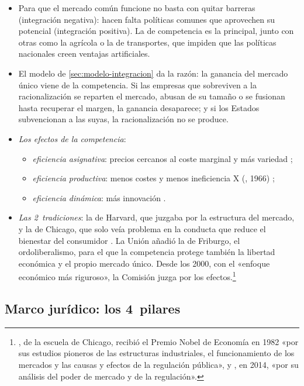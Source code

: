\documentclass[11pt]{article}
\begin{document}
\begin{itemize}
\item Para que el mercado común funcione no basta con quitar barreras (integración negativa): hacen falta políticas comunes que aprovechen su potencial (integración positiva). La de competencia es la principal, junto con otras como la agrícola o la de transportes, que impiden que las políticas nacionales creen ventajas artificiales.
\item El modelo de \ref{sec:modelo-integracion} da la razón: la ganancia del mercado único viene de la competencia. Si las empresas que sobreviven a la racionalización se reparten el mercado, abusan de su tamaño o se fusionan hasta recuperar el margen, la ganancia desaparece; y si los Estados subvencionan a las suyas, la racionalización no se produce.
\item \emph{Los efectos de la competencia}:
  \begin{itemize}
  \item \emph{eficiencia asignativa}: precios cercanos al coste marginal y más variedad ;
  \item \emph{eficiencia productiva}: menos costes y menos ineficiencia X (, 1966)\nocite{Leibenstein1966Allocative} ;
  \item \emph{eficiencia dinámica}: más innovación .
  \end{itemize}
\item \emph{Las 2~tradiciones}: la de Harvard, que juzgaba por la estructura del mercado, y la de Chicago, que solo veía problema en la conducta que reduce el bienestar del consumidor . La Unión añadió la de Friburgo, el ordoliberalismo, para el que la competencia protege también la libertad económica y el propio mercado único. Desde los 2000, con el «enfoque económico más riguroso», la Comisión juzga por los efectos.\footnote{, de la escuela de Chicago, recibió el Premio Nobel de Economía en 1982 «por sus estudios pioneros de las estructuras industriales, el funcionamiento de los mercados y las causas y efectos de la regulación pública»\nocite{Nobel1982Stigler}, y , en 2014, «por su análisis del poder de mercado y de la regulación»\nocite{Nobel2014Tirole}.}
\end{itemize}

\subsection{Marco jurídico: los 4~pilares}\label{sec:marco-competencia}
\end{document}
